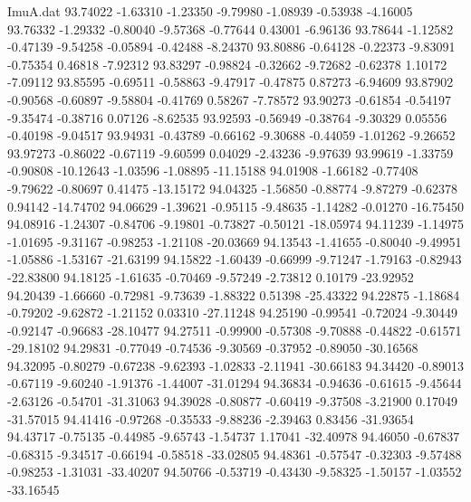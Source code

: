 \begin{filecontents}{ImuA.dat}
  93.74022   -1.63310   -1.23350   -9.79980   -1.08939   -0.53938   -4.16005
  93.76332   -1.29332   -0.80040   -9.57368   -0.77644    0.43001   -6.96136
  93.78644   -1.12582   -0.47139   -9.54258   -0.05894   -0.42488   -8.24370
  93.80886   -0.64128   -0.22373   -9.83091   -0.75354    0.46818   -7.92312
  93.83297   -0.98824   -0.32662   -9.72682   -0.62378    1.10172   -7.09112
  93.85595   -0.69511   -0.58863   -9.47917   -0.47875    0.87273   -6.94609
  93.87902   -0.90568   -0.60897   -9.58804   -0.41769    0.58267   -7.78572
  93.90273   -0.61854   -0.54197   -9.35474   -0.38716    0.07126   -8.62535
  93.92593   -0.56949   -0.38764   -9.30329    0.05556   -0.40198   -9.04517
  93.94931   -0.43789   -0.66162   -9.30688   -0.44059   -1.01262   -9.26652
  93.97273   -0.86022   -0.67119   -9.60599    0.04029   -2.43236   -9.97639
  93.99619   -1.33759   -0.90808  -10.12643   -1.03596   -1.08895  -11.15188
  94.01908   -1.66182   -0.77408   -9.79622   -0.80697    0.41475  -13.15172
  94.04325   -1.56850   -0.88774   -9.87279   -0.62378    0.94142  -14.74702
  94.06629   -1.39621   -0.95115   -9.48635   -1.14282   -0.01270  -16.75450
  94.08916   -1.24307   -0.84706   -9.19801   -0.73827   -0.50121  -18.05974
  94.11239   -1.14975   -1.01695   -9.31167   -0.98253   -1.21108  -20.03669
  94.13543   -1.41655   -0.80040   -9.49951   -1.05886   -1.53167  -21.63199
  94.15822   -1.60439   -0.66999   -9.71247   -1.79163   -0.82943  -22.83800
  94.18125   -1.61635   -0.70469   -9.57249   -2.73812    0.10179  -23.92952
  94.20439   -1.66660   -0.72981   -9.73639   -1.88322    0.51398  -25.43322
  94.22875   -1.18684   -0.79202   -9.62872   -1.21152    0.03310  -27.11248
  94.25190   -0.99541   -0.72024   -9.30449   -0.92147   -0.96683  -28.10477
  94.27511   -0.99900   -0.57308   -9.70888   -0.44822   -0.61571  -29.18102
  94.29831   -0.77049   -0.74536   -9.30569   -0.37952   -0.89050  -30.16568
  94.32095   -0.80279   -0.67238   -9.62393   -1.02833   -2.11941  -30.66183
  94.34420   -0.89013   -0.67119   -9.60240   -1.91376   -1.44007  -31.01294
  94.36834   -0.94636   -0.61615   -9.45644   -2.63126   -0.54701  -31.31063
  94.39028   -0.80877   -0.60419   -9.37508   -3.21900    0.17049  -31.57015
  94.41416   -0.97268   -0.35533   -9.88236   -2.39463    0.83456  -31.93654
  94.43717   -0.75135   -0.44985   -9.65743   -1.54737    1.17041  -32.40978
  94.46050   -0.67837   -0.68315   -9.34517   -0.66194   -0.58518  -33.02805
  94.48361   -0.57547   -0.32303   -9.57488   -0.98253   -1.31031  -33.40207
  94.50766   -0.53719   -0.43430   -9.58325   -1.50157   -1.03552  -33.16545

\end{filecontents}
